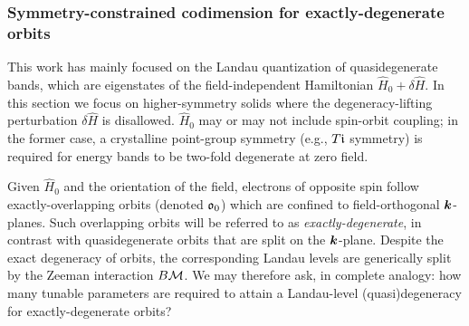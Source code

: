 \documentclass[aps, prb, showpacs, twocolumn, notitlepage, superscriptaddress]{revtex4-1}
\begin{document}

\subsubsection{Symmetry-constrained codimension for exactly-degenerate orbits}\label{sec:codimexactdeg}

This work has mainly focused on the Landau quantization of quasidegenerate bands, which are eigenstates of the field-independent Hamiltonian $\hat{H}_0{+}\delta \hat{H}$. In this section we focus on higher-symmetry solids where the degeneracy-lifting perturbation $\delta \hat{H}$ is disallowed. $\hat{H}_0$ may or may not include spin-orbit coupling; in the former case, a crystalline point-group symmetry (e.g., $T\mathfrak{i}$ symmetry) is required for energy bands to be  two-fold degenerate at zero field.

Given $\hat{H}_0$ and the orientation of the field, electrons of opposite spin follow exactly-overlapping orbits (denoted $\mathfrak{o}_0$) which are confined to field-orthogonal $\boldsymbol{k}$-planes. Such overlapping orbits will be referred to as \textit{exactly-degenerate}, in contrast with quasidegenerate orbits that are split on the $\boldsymbol{k}$-plane. Despite the exact degeneracy of orbits, the corresponding Landau levels are generically split by the Zeeman interaction $B{\cal M}$. We may therefore ask, in complete analogy: how many tunable parameters are required to attain a Landau-level (quasi)degeneracy for exactly-degenerate orbits? 


\end{document}
